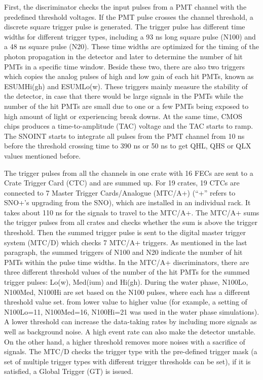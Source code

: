 First, the discriminator checks the input pulses from a PMT channel with the predefined threshold voltages. If the PMT pulse crosses the channel threshold, a discrete square trigger pulse is generated. The trigger pulse has different time widths for different trigger types, including a 93 ns long square pulse (N100) and a 48 ns square pulse (N20)\cite{joshTrigger}. These time widths are optimized for the timing of the photon propagation in the detector and later to determine the number of hit PMTs in a specific time window. Beside these two, there are also two triggers which copies the analog pulses of high and low gain of each hit PMTs, known as ESUMHi(gh) and ESUMLo(w). These triggers mainly measure the stability of the detector, in case that there would be large signals in the PMTs while the number of the hit PMTs are small due to one or a few PMTs being exposed to high amount of light or experiencing break downs\cite{operator}. At the same time, CMOS chips produces a time-to-amplitude (TAC) voltage and the TAC starts to ramp. The SNOINT starts to integrate all pulses from the PMT channel from 10 ns before the threshold crossing time to 390 ns or 50 ns to get QHL, QHS or QLX values mentioned before\cite{boger2000sudbury,stringer2019sensitivity}. 

The trigger pulses from all the channels in one crate with 16 FECs are sent to a Crate Trigger Card (CTC) and are summed up. For 19 crates, 19 CTCs are connected to 7 Master Trigger Cards/Analogue (MTC/A+) (``+'' refers to SNO+'s upgrading from the SNO), which are installed in an individual rack. It takes about 110 ns for the signals to travel to the MTC/A+. The MTC/A+ sums the trigger pulses from all crates and checks whether the sum is above the trigger threshold. Then the summed trigger pulse is sent to the digital master trigger system (MTC/D) which checks 7 MTC/A+ triggers. As mentioned in the last paragraph, the summed triggers of N100 and N20 indicate the number of hit PMTs within the pulse time widths. In the MTC/A+ discriminators, there are three different threshold values of the number of the hit PMTs for the summed trigger pulses: Lo(w), Med(ium) and Hi(gh). During the water phase, N100Lo, N100Med, N100Hi are set based on the N100 pulses, where each has a different threshold value set. from lower value to higher value (for example, a setting of N100Lo=11, N100Med=16, N100Hi=21 was used in the water phase simulations). A lower threshold can increase the data-taking rates by including more signals as well as background noise. A high event rate can also make the detector unstable. On the other hand, a higher threshold removes more noises with a sacrifice of signals. The MTC/D checks the trigger type with the pre-defined trigger mask (a set of multiple trigger types with different trigger thresholds can be set), if it is satisfied, a Global Trigger (GT) is issued\cite{snop_nim,stringer2019sensitivity,rattime}. 

